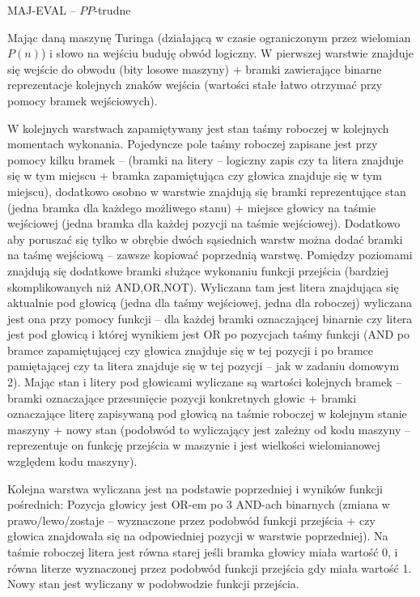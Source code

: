 \documentclass{article}
\begin{document}
MAJ-EVAL -- $PP$-trudne\newline

Mając daną maszynę Turinga (działającą w czasie ograniczonym przez wielomian $P(n)$) i słowo na wejściu buduję obwód logiczny.\newline
W pierwszej warstwie znajduje się wejście do obwodu (bity losowe maszyny)
+ bramki zawierające binarne reprezentacje kolejnych znaków wejścia (wartości stałe łatwo otrzymać przy pomocy bramek wejściowych).\newline

W kolejnych warstwach zapamiętywany jest stan taśmy roboczej w kolejnych momentach wykonania.
Pojedyncze pole taśmy roboczej zapisane jest przy pomocy kilku bramek --
(bramki na litery -- logiczny zapis czy ta litera znajduje się w tym miejscu + bramka zapamiętująca czy głowica znajduje się w tym miejscu),
dodatkowo osobno w warstwie znajdują się bramki reprezentujące stan (jedna bramka dla każdego możliwego stanu)
+ miejsce głowicy na taśmie wejściowej (jedna bramka dla każdej pozycji na taśmie wejściowej).
Dodatkowo aby poruszać się tylko w obrębie dwóch sąsiednich warstw można dodać bramki na taśmę wejściową -- zawsze kopiować poprzednią warstwę.\newline\newline
Pomiędzy poziomami znajdują się dodatkowe bramki służące wykonaniu funkcji przejścia (bardziej skomplikowanych niż AND,OR,NOT).\newline
Wyliczana tam jest litera znajdująca się aktualnie pod głowicą
(jedna dla taśmy wejściowej, jedna dla roboczej) wyliczana jest ona przy pomocy funkcji --
dla każdej bramki oznaczającej binarnie czy litera jest pod głowicą i której wynikiem jest OR po pozycjach taśmy funkcji
(AND po bramce zapamiętującej czy głowica znajduje się w tej pozycji i po bramce pamiętającej czy ta litera znajduje się w tej pozycji
-- jak w zadaniu domowym 2).\newline
Mając stan i litery pod głowicami wyliczane są wartości kolejnych bramek -- bramki oznaczające przesunięcie pozycji konkretnych głowic +
bramki oznaczające literę zapisywaną pod głowicą na taśmie roboczej w kolejnym stanie maszyny + nowy stan
(podobwód to wyliczający jest zależny od kodu maszyny -- reprezentuje on funkcję przejścia w maszynie i jest wielkości wielomianowej względem kodu maszyny).\newline

Kolejna warstwa wyliczana jest na podstawie poprzedniej i wyników funkcji pośrednich:\newline
Pozycja głowicy jest OR-em po 3 AND-ach binarnych (zmiana w prawo/lewo/zostaje -- wyznaczone przez podobwód funkcji przejścia
+ czy głowica znajdowała się na odpowiedniej pozycji w warstwie poprzedniej). Na taśmie roboczej litera jest równa starej jeśli bramka głowicy miała wartość 0,
i równa literze wyznaczonej przez podobwód funkcji przejścia gdy miała wartość 1.\newline
Nowy stan jest wyliczany w podobwodzie funkcji przejścia.\newline
\end{document}
